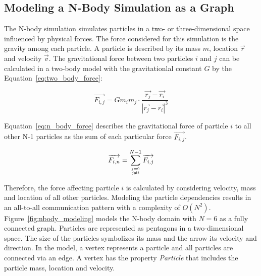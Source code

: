 \subsection{Modeling a N-Body Simulation as a Graph}
\label{sec:design:nbody}


The N-body simulation simulates particles in a two- or
three-dimensional space influenced by physical forces. The force
considered for this simulation is the gravity among each particle.  A
particle is described by its mass $m$, location $\overrightarrow{r}$
and velocity $\overrightarrow{v}$.  The gravitational force between
two particles $i$ and $j$ can be calculated in a two-body model with
the gravitationlal constant $G$ by the
Equation~\ref{eq:two_body_force}:

\begin{equation}
  \label{eq:two_body_force}
  \overrightarrow{F_{i,j}} = G  m_i  m_j \cdot \frac{\overrightarrow{r_j} - \overrightarrow{r_i}}{|\overrightarrow{r_j} - \overrightarrow{r_i}|^3}
\end{equation}

\noindent Equation~\ref{eq:n_body_force} describes the gravitational force of
particle $i$ to all other N-1 particles as the sum of each particular
force $\overrightarrow{F_{i,j}}$.

\begin{equation}
  \label{eq:n_body_force}
  \overrightarrow{F_{i,n}} = \sum_{j = 0 \atop j \neq i}^{N-1} \overrightarrow{F_{i,j}}
\end{equation}

\noindent Therefore, the force affecting particle $i$ is calculated by
considering velocity, mass and location of all other
particles. Modeling the particle dependencies results in an all-to-all
communication pattern with a complexity of
$O(N^2)$. Figure~\ref{fig:nbody_modeling} models the N-body domain
with $N = 6$ as a fully connected graph. Particles are represented as
pentagons in a two-dimensional space. The size of the particles
symbolizes its mass and the arrow its velocity and direction.  In the
model, a vertex represents a particle and all particles are connected
via an edge. A vertex has the property \emph{Particle} that includes
the particle mass, location and velocity.

